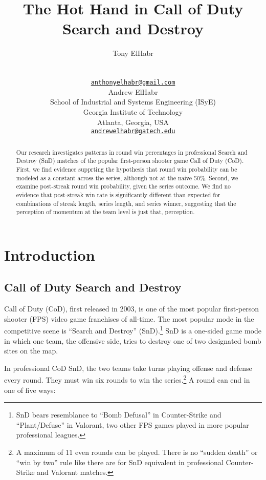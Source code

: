 \documentclass{article}
\title{The Hot Hand in Call of Duty Search and Destroy}
\author{
    Tony ElHabr
   \\
     \\
   \\
  \texttt{\href{mailto:anthonyelhabr@gmail.com}{\nolinkurl{anthonyelhabr@gmail.com}}} \\
   \And
    Andrew ElHabr
   \\
    School of Industrial and Systems Engineering (ISyE) \\
    Georgia Institute of Technology \\
  Atlanta, Georgia, USA \\
  \texttt{\href{mailto:andrewelhabr@gatech.edu}{\nolinkurl{andrewelhabr@gatech.edu}}} \\
  }
\begin{document}
\maketitle


\begin{abstract}
Our research investigates patterns in round win percentages in
professional Search and Destroy (SnD) matches of the popular
first-person shooter game Call of Duty (CoD). First, we find evidence
supprting the hypothesis that round win probability can be modeled as a
constant across the series, although not at the naive 50\%. Second, we
examine post-streak round win probability, given the series outcome. We
find no evidence that post-streak win rate is significantly different
than expected for combinations of streak length, series length, and
series winner, suggesting that the perception of momentum at the team
level is just that, perception.
\end{abstract}


\hypertarget{introduction}{%
\section{Introduction}\label{introduction}}

\hypertarget{call-of-duty-search-and-destroy}{%
\subsection{Call of Duty Search and
Destroy}\label{call-of-duty-search-and-destroy}}

Call of Duty (CoD), first released in 2003, is one of the most popular
first-person shooter (FPS) video game franchises of all-time. The most
popular mode in the competitive scene is ``Search and Destroy''
(SnD).\footnote{SnD bears resemblance to ``Bomb Defusal'' in
  Counter-Strike and ``Plant/Defuse'' in Valorant, two other FPS games
  played in more popular professional leagues.} SnD is a one-sided game
mode in which one team, the offensive side, tries to destroy one of two
designated bomb sites on the map.

In professional CoD SnD, the two teams take turns playing offense and
defense every round. They must win six rounds to win the
series.\footnote{A maximum of 11 even rounds can be played. There is no
  ``sudden death'' or ``win by two'' rule like there are for SnD
  equivalent in professional Counter-Strike and Valorant matches.} A
round can end in one of five ways:
\end{document}
